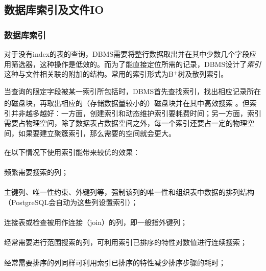 \subsection{数据库索引及文件IO}
\subsubsection{数据库索引}
对于没有index的表的查询，DBMS需要将整行数据取出并在其中少数几个字段应用筛选器，这种操作是低效的。而为了能直接定位所需的记录，DBMS设计了\emph{索引}这种与文件相关联的附加的结构。常用的索引形式为B$^+$树及散列索引。
\par 当查询的限定字段被某一索引所包括时，DBMS首先查找索引，找出相应记录所在的磁盘块，再取出相应的（存储数据量较小的）磁盘块并在其中高效搜索\textsuperscript{\cite{silberschatz-2010}} 。但索引并非越多越好：一方面，创建索引和动态维护索引要耗费时间；另一方面，索引需要占物理空间，除了数据表占数据空间之外，每一个索引还要占一定的物理空间，如果要建立聚簇索引，那么需要的空间就会更大。


\par 在以下情况下使用索引能带来较优的效果\textsuperscript{\cite{silberschatz-2010}}：
\vspace{-1.5em}
\paragraph{} 频繁需要搜索的列；
\vspace{-1.5em}
\paragraph{} 主键列、唯一性约束、外键列等，强制该列的唯一性和组织表中数据的排列结构（PostgreSQL会自动为这些列设置索引）；
\vspace{-1.5em}
\paragraph{} 连接表或检查被用作连接（join）的列，即一般指外键列；
\vspace{-1.5em}
\paragraph{} 经常需要进行范围搜索的列，可利用索引已排序的特性对数值进行连续搜索；
\vspace{-1.5em}
\paragraph{} 经常需要排序的列同样可利用索引已排序的特性减少排序步骤的耗时；
\vspace{-1.5em}
